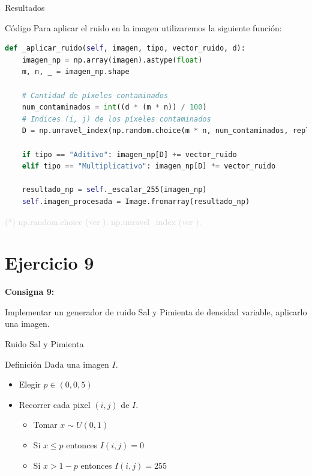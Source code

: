\documentclass{beamer}
\begin{document}
\begin{frame}[fragile]{Resultados}
\begin{minipage}{0.45\linewidth}
		\label{fig:lenaej8}
	\end{minipage}
\end{frame}

\begin{frame}[fragile]{Código}
	\justifying
	Para aplicar el ruido en la imagen utilizaremos la siguiente función:
	
	\begin{lstlisting}[language=Python]
def _aplicar_ruido(self, imagen, tipo, vector_ruido, d):
	imagen_np = np.array(imagen).astype(float)
	m, n, _ = imagen_np.shape
	
	# Cantidad de píxeles contaminados
	num_contaminados = int((d * (m * n)) / 100)
	# Indices (i, j) de los píxeles contaminados
	D = np.unravel_index(np.random.choice(m * n, num_contaminados, replace=False),(m, n))
	
	if tipo == "Aditivo": imagen_np[D] += vector_ruido
	elif tipo == "Multiplicativo": imagen_np[D] *= vector_ruido
	
	resultado_np = self._escalar_255(imagen_np)
	self.imagen_procesada = Image.fromarray(resultado_np)
	\end{lstlisting}
	
	\vfill
	\footnotesize \textcolor{lightgray}{(*) np.random.choice (ver \cite{numpy-random.choice}). np.unravel\_index (ver \cite{numpy-unravel-index}).}
\end{frame}

\section{Ejercicio 9}

\begin{frame}
	\begin{center}
		\textcolor{unahurverde}{\textbf{Consigna 9:}}
	\end{center}
	\justifying
	
	Implementar un generador de ruido Sal y Pimienta de densidad variable, aplicarlo una
	imagen.
\end{frame}

\begin{frame}[fragile]{Ruido Sal y Pimienta}
	\justifying
	
	\begin{block}{Definición}
		Dada una imagen $I$.
		\begin{itemize}
			\item Elegir $p \in (0, 0,5)$
			\item Recorrer cada pixel $(i, j)$ de $I$.
			\begin{itemize}
				\item Tomar $x \sim U(0,1)$
				\item Si $x \leq p$ entonces $I(i,j) = 0$
				\item Si $x > 1 - p$ entonces $I(i,j) = 255$
			\end{itemize}
		\end{itemize}
	\end{block}
\end{frame}
\end{document}
